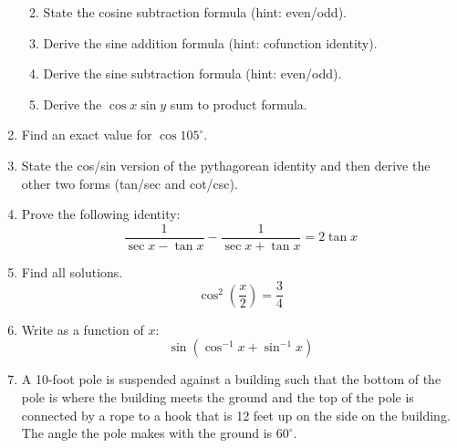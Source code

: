 \documentclass[letterpaper,12pt,fleqn]{article}
\begin{document}
\begin{enumerate}
\begin{enumerate}
    \vspace{1in}
    
  \item State the cosine subtraction formula (hint: even/odd).

    \vspace{1in}
    
  \item Derive the sine addition formula (hint: cofunction identity).

    \vspace{2in}
    
  \item Derive the sine subtraction formula (hint: even/odd).

    \vspace{1in}
    
  \item Derive the $\cos{x}\sin{y}$ sum to product formula.

   \vspace{3in}

  \end{enumerate}

\item Find an exact value for $\cos105^{\circ}$.

  \vspace{2in}

\item State the cos/sin version of the pythagorean identity and then
  derive the other two forms (tan/sec and cot/csc).

  \vspace{3in}

\item Prove the following identity:
  \[\frac{1}{\sec{x}-\tan{x}}-\frac{1}{\sec{x}+\tan{x}}=2\tan{x}\]

  \vspace{3in}

\item Find all solutions.
  \[\cos^2\left(\frac{x}{2}\right)=\frac{3}{4}\]

  \vspace{4in}
  
\item Write as a function of $x$:
  \[\sin\left(\cos^{-1}x+\sin^{-1}x\right)\]
\newpage
\item A 10-foot pole is suspended against a building such that the bottom of
  the pole is where the building meets the ground and the top of the pole is
  connected by a rope to a hook that is 12 feet up on the side on the building.
  The angle the pole makes with the ground is $60^{\circ}$.


\end{enumerate}
\end{document}
